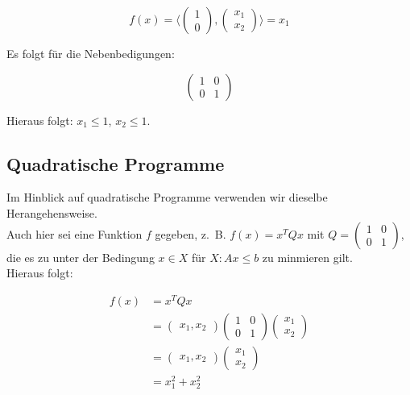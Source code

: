 \documentclass[a4paper]{article}
\begin{document}
\begin{multicols}{2}
\begin{equation*}
f(x) = \langle \begin{pmatrix}1 \\ 0 \end{pmatrix}, \begin{pmatrix}x_{1} \\ x_{2} \end{pmatrix} \rangle = x_{1}
\end{equation*}

Es folgt für die Nebenbedigungen:

\begin{equation*}
\begin{pmatrix}1 & 0 \\ 0 & 1 \end{pmatrix}
\end{equation*}

Hieraus folgt: $x_{1} \le 1$, $x_{2} \le 1$.

\subsection{Quadratische Programme}

Im Hinblick auf quadratische Programme verwenden wir dieselbe Herangehensweise. \\
Auch hier sei eine Funktion $f$ gegeben, z.~B. $f(x) = x^{T}Qx$ mit $Q = \begin{pmatrix}1 & 0 \\ 0 & 1 \end{pmatrix}$, die es zu unter der Bedingung $x \in X$ für $X: Ax \le b$ zu minmieren gilt.\\
Hieraus folgt:

\begin{align*}
f(x) &= x^{T}Qx \\
&= \begin{pmatrix}x_{1}, x_{2}\end{pmatrix} \begin{pmatrix}1 & 0 \\ 0 & 1\end{pmatrix} \begin{pmatrix}x_{1} \\ x_{2}\end{pmatrix} \\
&= \begin{pmatrix}x_{1}, x_{2}\end{pmatrix} \begin{pmatrix}x_{1} \\ x_{2}\end{pmatrix} \\
&= x_{1}^{2} + x_{2}^{2}
\end{align*}

\end{multicols}
\end{document}
